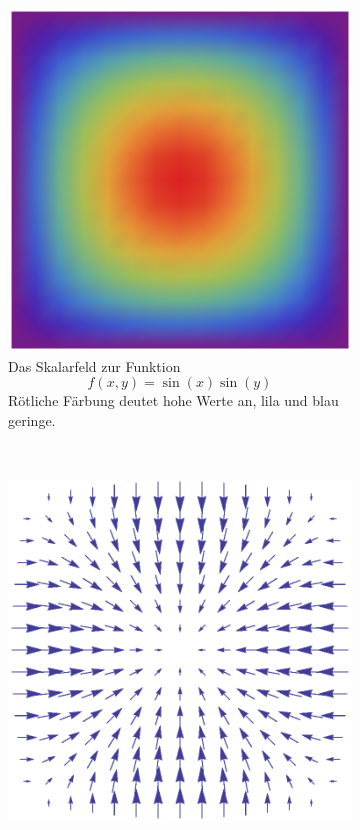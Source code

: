 \begin{figure}[ht]
        \captionsetup{singlelinecheck=off}
	\begin{subfigure}[t]{0.5\textwidth}
		\centering
		\includegraphics[width=\textwidth]{images/scalar_field_to_show_gradient}
		\caption{Das Skalarfeld zur Funktion \[ f(x,y) = \sin(x)\sin(y) \] Rötliche Färbung deutet hohe Werte an, lila und blau geringe.}
		\label{fig:mathematics_sample_scalar_field}
	\end{subfigure}
	~
	\begin{subfigure}[t]{0.5\textwidth}
		\centering
		\includegraphics[width=\textwidth]{images/gradient_of_scalar_field}

\end{subfigure}
\end{figure}
